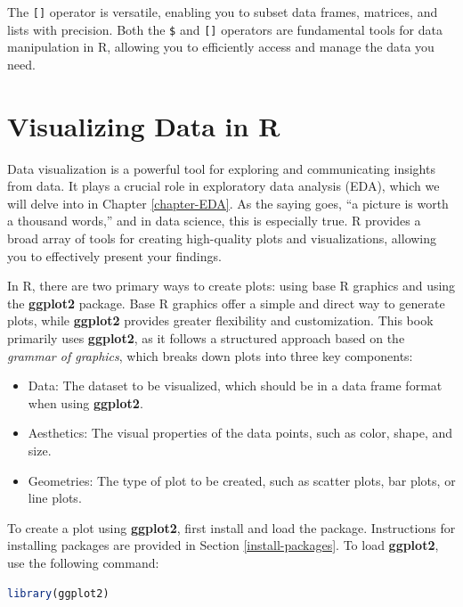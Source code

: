 \documentclass[
  11pt,
]{book}
\newcommand{\passthrough}[1]{#1}
\providecommand{\tightlist}{%
  \setlength{\itemsep}{0pt}\setlength{\parskip}{0pt}}
\theoremstyle{definition}
\theoremstyle{definition}
\theoremstyle{definition}
\theoremstyle{definition}
\theoremstyle{remark}
\begin{document}
The \passthrough{\lstinline![]!} operator is versatile, enabling you to subset data frames, matrices, and lists with precision. Both the \passthrough{\lstinline!$!} and \passthrough{\lstinline![]!} operators are fundamental tools for data manipulation in R, allowing you to efficiently access and manage the data you need.

\section{Visualizing Data in R}\label{visualizing-data-in-r}

Data visualization is a powerful tool for exploring and communicating insights from data. It plays a crucial role in exploratory data analysis (EDA), which we will delve into in Chapter \ref{chapter-EDA}. As the saying goes, ``a picture is worth a thousand words,'' and in data science, this is especially true. R provides a broad array of tools for creating high-quality plots and visualizations, allowing you to effectively present your findings.

In R, there are two primary ways to create plots: using base R graphics and using the \textbf{ggplot2} package. Base R graphics offer a simple and direct way to generate plots, while \textbf{ggplot2} provides greater flexibility and customization. This book primarily uses \textbf{ggplot2}, as it follows a structured approach based on the \emph{grammar of graphics}, which breaks down plots into three key components:

\begin{itemize}
\tightlist
\item
  Data: The dataset to be visualized, which should be in a data frame format when using \textbf{ggplot2}.\\
\item
  Aesthetics: The visual properties of the data points, such as color, shape, and size.\\
\item
  Geometries: The type of plot to be created, such as scatter plots, bar plots, or line plots.
\end{itemize}

To create a plot using \textbf{ggplot2}, first install and load the package. Instructions for installing packages are provided in Section \ref{install-packages}. To load \textbf{ggplot2}, use the following command:

\begin{lstlisting}[language=R]
library(ggplot2)
\end{lstlisting}
\end{document}
